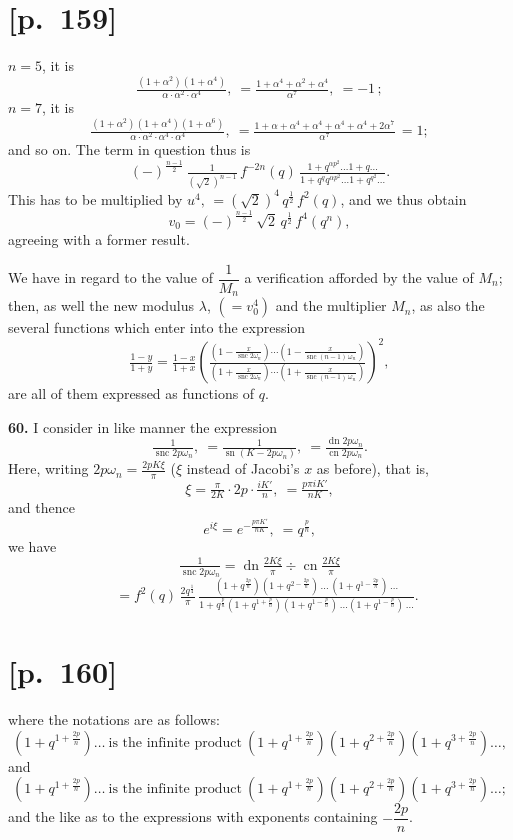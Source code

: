 \documentclass[11pt]{article}
\begin{document}
\section*{[p.~159]}
$n=5$, it is
\[
\tfrac{(1+\alpha^2)(1+\alpha^4)}{\alpha\cdot\alpha^2\cdot\alpha^4},\ =\tfrac{1+\alpha^4+\alpha^2+\alpha^4}{\alpha^7},\ =-1\,;
\]
$n=7$, it is
\[
\tfrac{(1+\alpha^2)(1+\alpha^4)(1+\alpha^6)}{\alpha\cdot\alpha^2\cdot\alpha^4\cdot\alpha^4},\ =\tfrac{1+\alpha+\alpha^4+\alpha^4+\alpha^4+\alpha^4+2\alpha^7}{\alpha^7}\,=1;
\]
and so on. The term in question thus is
\[
(-)^{\frac{n-1}{2}}\,\tfrac{1}{(\sqrt{2})^{n-1}}\,f^{-2n}(q)\,\tfrac{1+q^{\alpha p^2}\ldots 1+q\ldots}{1+q^{q}q^{\alpha p^2}\ldots 1+q^{q^2}\ldots}.
\]
This has to be multiplied by $u^4,\,=(\sqrt{2})^4\,q^{\frac{1}{2}}\,f^{2}(q)$, and we thus obtain
\[
v_0=(-)^{\frac{n-1}{2}}\,\sqrt{2}\,q^{\frac{1}{2}}\,f^4(q^n),
\]
agreeing with a former result.

We have in regard to the value of $\dfrac{1}{M_n}$ a verification afforded by the value of $M_n$;
then, as well the new modulus $\lambda$, $(=v_0^4)$ and the multiplier $M_n$, as also the several
functions which enter into the expression
\[
\tfrac{1-y}{1+y}=\tfrac{1-x}{1+x}\!\left(\tfrac{\left(1-\tfrac{x}{\operatorname{snc}2\omega_n}\right)\cdots\!\left(1-\tfrac{x}{\operatorname{snc}(n-1)\,\omega_n}\right)}{\left(1+\tfrac{x}{\operatorname{snc}2\omega_n}\right)\cdots\!\left(1+\tfrac{x}{\operatorname{snc}(n-1)\,\omega_n}\right)}\right)^{\!2}\!,
\]
are all of them expressed as functions of $q$.

\medskip
\noindent\textbf{60.} I consider in like manner the expression
\[
\tfrac{1}{\operatorname{snc}2p\omega_n},\ =\tfrac{1}{\operatorname{sn}(K-2p\omega_n)},\ =\tfrac{\operatorname{dn}2p\omega_n}{\operatorname{cn}2p\omega_n}.
\]
Here, writing $2p\omega_n=\tfrac{2pK\xi}{\pi}$ ($\xi$ instead of Jacobi's $x$ as before), that is,
\[
\xi=\tfrac{\pi}{2K}\cdot 2p\cdot\tfrac{iK'}{n},\ =\tfrac{p\pi iK'}{nK},
\]
and thence
\[
e^{i\xi}=e^{-\frac{p\pi K'}{nK}},\ =q^{\frac{p}{n}},
\]
we have
\[
\tfrac{1}{\operatorname{snc}2p\omega_n}=\operatorname{dn}\!\tfrac{2K\xi}{\pi}\div\operatorname{cn}\!\tfrac{2K\xi}{\pi}
\]
\[
\quad=f^2(q)\,\tfrac{2q^{\frac{1}{4}}}{\pi}\,\tfrac{(1+q^{\frac{2p}{n}})(1+q^{2-\frac{2p}{n}})\,\ldots\,(1+q^{1-\frac{2p}{n}})\,\ldots}{1+q^{\frac{p}{n}}(1+q^{1+\frac{p}{n}})(1+q^{1-\frac{p}{n}})\,\ldots(1+q^{1-\frac{p}{n}})\,\ldots}.
\]

\section*{[p.~160]}
where the notations are as follows:
\[
(1+q^{1+\frac{2p}{n}})\ldots\ \text{is the infinite product}\ (1+q^{1+\frac{2p}{n}})(1+q^{2+\frac{2p}{n}})(1+q^{3+\frac{2p}{n}})\ldots,
\]
and
\[
(1+q^{1+\frac{2p}{n}})\ldots\ \text{is the infinite product}\ (1+q^{1+\frac{2p}{n}})(1+q^{2+\frac{2p}{n}})(1+q^{3+\frac{2p}{n}})\ldots;
\]
and the like as to the expressions with exponents containing $-\dfrac{2p}{n}$.
\end{document}
